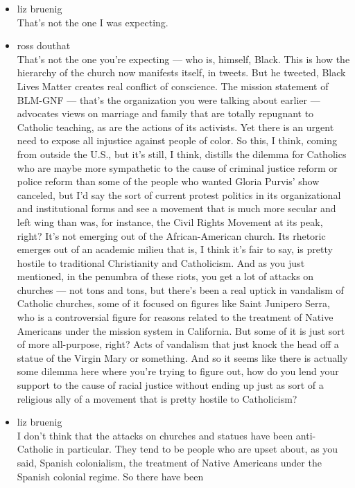 \begin{itemize}
\item
  liz bruenig\\
  That's not the one I was expecting.
\item
  ross douthat\\
  That's not the one you're expecting --- who is, himself, Black. This
  is how the hierarchy of the church now manifests itself, in tweets.
  But he tweeted, Black Lives Matter creates real conflict of
  conscience. The mission statement of BLM-GNF --- that's the
  organization you were talking about earlier --- advocates views on
  marriage and family that are totally repugnant to Catholic teaching,
  as are the actions of its activists. Yet there is an urgent need to
  expose all injustice against people of color. So this, I think, coming
  from outside the U.S., but it's still, I think, distills the dilemma
  for Catholics who are maybe more sympathetic to the cause of criminal
  justice reform or police reform than some of the people who wanted
  Gloria Purvis' show canceled, but I'd say the sort of current protest
  politics in its organizational and institutional forms and see a
  movement that is much more secular and left wing than was, for
  instance, the Civil Rights Movement at its peak, right? It's not
  emerging out of the African-American church. Its rhetoric emerges out
  of an academic milieu that is, I think it's fair to say, is pretty
  hostile to traditional Christianity and Catholicism. And as you just
  mentioned, in the penumbra of these riots, you get a lot of attacks on
  churches --- not tons and tons, but there's been a real uptick in
  vandalism of Catholic churches, some of it focused on figures like
  Saint Junipero Serra, who is a controversial figure for reasons
  related to the treatment of Native Americans under the mission system
  in California. But some of it is just sort of more all-purpose, right?
  Acts of vandalism that just knock the head off a statue of the Virgin
  Mary or something. And so it seems like there is actually some dilemma
  here where you're trying to figure out, how do you lend your support
  to the cause of racial justice without ending up just as sort of a
  religious ally of a movement that is pretty hostile to Catholicism?
\item
  liz bruenig\\
  I don't think that the attacks on churches and statues have been
  anti-Catholic in particular. They tend to be people who are upset
  about, as you said, Spanish colonialism, the treatment of Native
  Americans under the Spanish colonial regime. So there have been

\end{itemize}
